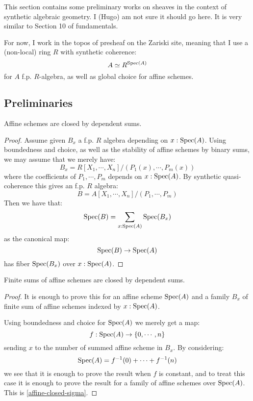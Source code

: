 This section contains some preliminary works on sheaves in the context of synthetic algebraic geometry. I (Hugo) am not sure it should go here. It is very similar to Section 10 of fundamentals.

For now, I work in the topos of presheaf on the Zariski site, meaning that I use a (non-local) ring $R$ with synthetic coherence:
\[ A \simeq R^{\operatorname{Spec}(A)} \]
for $A$ f.p. $R$-algebra, as well as global choice for affine schemes.

\subsection{Preliminaries}

\begin{lemma}\label{affine-closed-sigma}
Affine schemes are closed by dependent sums.
\end{lemma}

\begin{proof}
Assume given $B_x$ a f.p. $R$ algebra depending on $x:\operatorname{Spec}(A)$. Using boundedness and choice, as well as the stability of affine schemes by binary sums, we may assume that we merely have:
\[B_x = R[X_1,\cdots,X_n]/(P_1(x),\cdots, P_m(x))\]
where the coefficients of $P_1,\cdots,P_m$ depends on $x:\operatorname{Spec}(A)$. By synthetic quasi-coherence this gives an f.p. $R$ algebra:
\[B = A[X_1,\cdots,X_n]/(P_1,\cdots, P_m)\]
Then we have that:
\[\operatorname{Spec}(B) = \sum_{x:\operatorname{Spec}(A)} \operatorname{Spec}(B_x)\]
as the canonical map:
\[\operatorname{Spec}(B) \to \operatorname{Spec}(A)\]
has fiber $\operatorname{Spec}(B_x)$ over $x:\operatorname{Spec}(A)$.
\end{proof}

\begin{lemma}\label{sum-affine-closed-sigma}
Finite sums of affine schemes are closed by dependent sums.
\end{lemma}

\begin{proof}
It is enough to prove this for an affine scheme $\operatorname{Spec}(A)$ and a family $B_x$ of finite sum of affine schemes indexed by $x:\operatorname{Spec}(A)$.

Using boundedness and choice for $\operatorname{Spec}(A)$ we merely get a map:
\[f:\operatorname{Spec}(A) \to \{0,\cdots,n\}\]
sending $x$ to the number of summed affine scheme in $B_x$. By considering:
\[\operatorname{Spec}(A) = f^{-1}(0) + \cdots + f^{-1}(n)\]
we see that it is enough to prove the result when $f$ is constant, and to treat this case it is enough to prove the result for a family of affine schemes over $\operatorname{Spec}(A)$. This is \cref{affine-closed-sigma}.
\end{proof}

